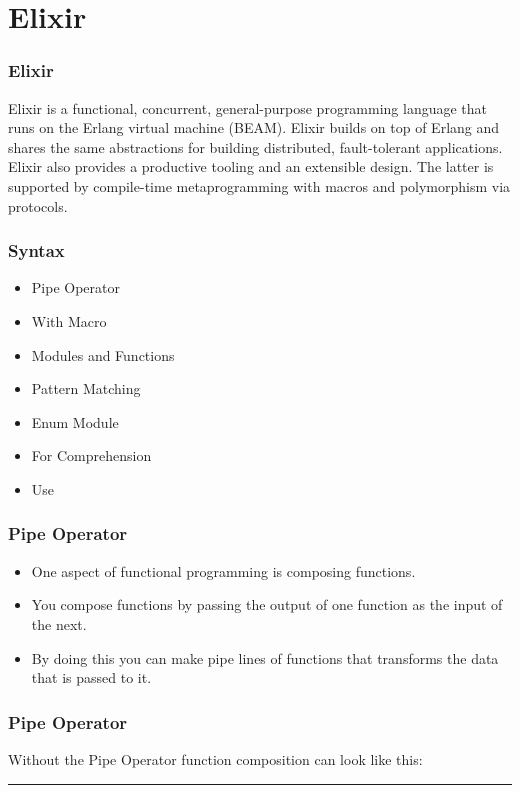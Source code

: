 \documentclass{beamer}
\begin{document}
\section{Elixir}

\begin{frame}
\frametitle{Elixir}

Elixir is a \alert{functional}, \alert{concurrent}, general-purpose programming language that runs on the Erlang virtual machine (BEAM). Elixir builds on top of Erlang and shares the same abstractions for building \alert{distributed}, \alert{fault-tolerant} applications. Elixir also provides a productive tooling and an extensible design. The latter is supported by compile-time metaprogramming with macros and polymorphism via protocols.

\end{frame}
\begin{frame}
\frametitle{Syntax}

\begin{itemize}
\item{Pipe Operator}
\item{With Macro}
\item{Modules and Functions}
\item{Pattern Matching}
\item{Enum Module}
\item{For Comprehension}
\item{Use}
\end{itemize}
\end{frame}

\begin{frame}
  \frametitle{Pipe Operator}
  
  \begin{itemize}
    \item{One aspect of functional programming is composing functions.} \pause
    \item{You compose functions by passing the output of one function as the input of the next.} \pause
    \item{By doing this you can make pipe lines of functions that transforms the data that is passed to it.}
  \end{itemize}
\end{frame}

\begin{frame}
  \frametitle{Pipe Operator}
  Without the Pipe Operator function composition can look like this:
  \rule{10.8cm}{0.4pt}
  \ErlangPipe
\end{frame}
\end{document}
